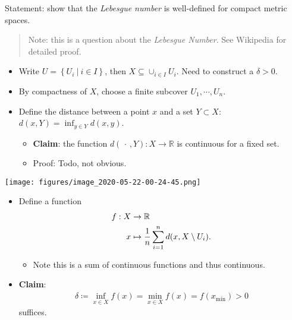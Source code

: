 \begin{solution}

\hfill

\begin{concept}

\hfill

\end{concept}

Statement: show that the \emph{Lebesgue number} is well-defined for
compact metric spaces.

\begin{quote}
Note: this is a question about the \emph{Lebesgue Number}. See Wikipedia
for detailed proof.
\end{quote}

\begin{itemize}
\tightlist
\item
  Write \(U = \left\{{U_i {~\mathrel{\Big|}~}i\in I}\right\}\), then
  \(X \subseteq \cup_{i\in I} U_i\). Need to construct a \(\delta > 0\).
\item
  By compactness of \(X\), choose a finite subcover
  \(U_1, \cdots, U_n\).
\item
  Define the distance between a point \(x\) and a set \(Y\subset X\):
  \(d(x, Y) = \inf_{y\in Y} d(x, y)\).

  \begin{itemize}
  \tightlist
  \item
    \textbf{Claim}: the function
    \(d({\,\cdot\,}, Y): X\to {\mathbb{R}}\) is continuous for a fixed
    set.
  \item
    Proof: Todo, not obvious.
  \end{itemize}
\end{itemize}

\texttt{[image: figures/image\_2020-05-22-00-24-45.png]}

\begin{itemize}
\tightlist
\item
  Define a function
  \begin{align*}     f: X &\to {\mathbb{R}}\\     x &\mapsto {1\over n} \sum_{i=1}^n d(x, X\setminus U_i)      .\end{align*}

  \begin{itemize}
  \tightlist
  \item
    Note this is a sum of continuous functions and thus continuous.
  \end{itemize}
\item
  \textbf{Claim}:
  \begin{align*}\delta \coloneqq\inf_{x\in X}f(x) = \min_{x\in X}f(x) = f(x_{\text{min}}) > 0\end{align*}
  suffices.


\end{itemize}
\end{solution}
